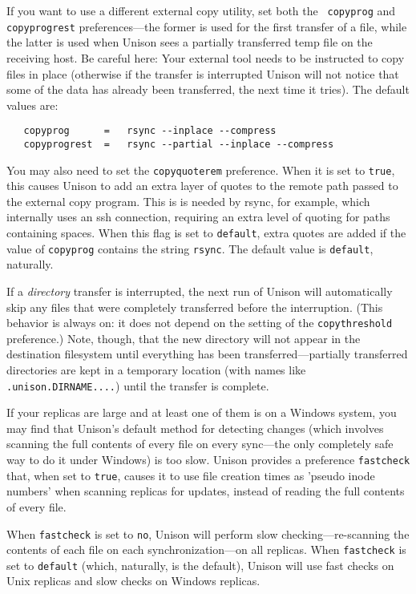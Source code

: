 \documentclass{article}
\begin{document}
If you want to use a different external copy utility, set both the {\tt
  copyprog} and {\tt copyprogrest} preferences---the former is used for
the first transfer of a file, while the latter is used when Unison sees a
partially transferred temp file on the receiving host.  Be careful here:
Your external tool needs to be instructed to copy files in place (otherwise
if the transfer is interrupted Unison will not notice that some of the data
has already been transferred, the next time it tries).  The default values
are:
\begin{verbatim}
   copyprog      =   rsync --inplace --compress
   copyprogrest  =   rsync --partial --inplace --compress
\end{verbatim}
You may also need to set the {\tt copyquoterem} preference.  When it is set
to {\tt true}, this causes Unison to add an extra layer of quotes to
the remote path passed to the external copy program. This is is needed by
rsync, for example, which internally uses an ssh connection, requiring an
extra level of quoting for paths containing spaces. When this flag is set to
{\tt default}, extra quotes are added if the value of {\tt copyprog}
contains the string {\tt rsync}.  The default value is {\tt default},
naturally.

If a {\em directory} transfer is interrupted, the next run of Unison will
automatically skip any files that were completely transferred before the
interruption.  (This behavior is always on: it does not depend on the
setting of the {\tt copythreshold} preference.)  Note, though, that the new
directory will not appear in the destination filesystem until everything has
been transferred---partially transferred directories are kept in a temporary
location (with names like {\tt .unison.DIRNAME....}) until the transfer is
complete.



If your replicas are large and at least one of them is on a Windows
system, you may find that Unison's default method for detecting changes
(which involves scanning the full contents of every file on every
sync---the only completely safe way to do it under Windows) is too slow.
Unison provides a preference {\tt fastcheck} that, when set to
\verb|true|, causes it to use file creation times as 'pseudo inode
numbers' when scanning replicas for updates, instead of reading the full
contents of every file.

When \verb|fastcheck| is set to \verb|no|,
Unison will perform slow checking---re-scanning the contents of each file
on each synchronization---on all replicas.  When \verb|fastcheck| is set
to \verb|default| (which, naturally, is the default), Unison will use
fast checks on Unix replicas and slow checks on Windows replicas.
\end{document}
